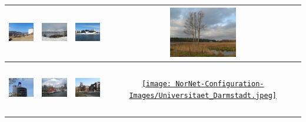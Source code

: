 \begin{small}
\begin{center}
\begin{longtable}{|c|c|c|c|}
 \hyperref[sec:NTNU]{\includegraphics[keepaspectratio,width=9em,height=6em]{NorNet-Configuration-Images/Universitetet_i_Trondheim.jpeg}} & \hyperref[sec:HiN]{\includegraphics[keepaspectratio,width=9em,height=6em]{NorNet-Configuration-Images/Hoegskolen_i_Narvik.jpeg}} & \hyperref[sec:HiOA]{\includegraphics[keepaspectratio,width=9em,height=6em]{NorNet-Configuration-Images/Hoegskolen_i_Oslo_og_Akershus.jpeg}} & \hyperref[sec:KAU]{\includegraphics[keepaspectratio,width=9em,height=6em]{NorNet-Configuration-Images/Karlstads_Universitet.jpeg}} \\ \hline
 \hyperref[sec:TUKL]{\includegraphics[keepaspectratio,width=9em,height=6em]{NorNet-Configuration-Images/Universitaet_Kaiserslautern.jpeg}} & \hyperref[sec:HAW]{\includegraphics[keepaspectratio,width=9em,height=6em]{NorNet-Configuration-Images/Hochschule_Hamburg.jpeg}} & \hyperref[sec:UDE]{\includegraphics[keepaspectratio,width=9em,height=6em]{NorNet-Configuration-Images/Universitaet_Duisburg-Essen.jpeg}} & \hyperref[sec:TUDA]{\texttt{[image: NorNet-Configuration-Images/Universitaet\_Darmstadt.jpeg]}} \\ \hline

\end{longtable}
\end{center}
\end{small}
